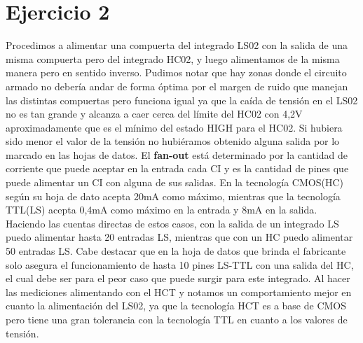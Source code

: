 \part*{Ejercicio 2}
Procedimos a alimentar una compuerta del integrado LS02 con la salida de una misma compuerta pero del integrado HC02, y luego alimentamos de la misma manera pero en sentido inverso. Pudimos notar que hay zonas donde el circuito armado no deber\'ia andar de forma \'optima por el margen de ruido que manejan las distintas compuertas pero funciona igual ya que la ca\'ida de tensi\'on en el LS02 no es tan grande y alcanza a caer cerca del l\'imite del HC02 con 4,2V aproximadamente que es el m\'inimo del estado HIGH para el HC02. Si hubiera sido menor el valor de la tensi\'on no hubi\'eramos obtenido alguna salida por lo marcado en las hojas de datos.
\newline
El \textbf{fan-out} est\'a determinado por la cantidad de corriente que puede aceptar en la entrada cada CI y es la cantidad de pines que puede alimentar un CI con alguna de sus salidas. En la tecnolog\'ia CMOS(HC) seg\'un su hoja de dato acepta 20mA como m\'aximo, mientras que la tecnolog\'ia TTL(LS) acepta 0,4mA como m\'aximo en la entrada y 8mA en la salida. Haciendo las cuentas directas de estos casos, con la salida de un integrado LS puedo alimentar hasta 20 entradas LS, mientras que con un HC puedo alimentar 50 entradas LS. Cabe destacar que en la hoja de datos que brinda el fabricante solo asegura el funcionamiento de hasta 10 pines LS-TTL con una salida del HC, el cual debe ser para el peor caso que puede surgir para este integrado.
\newline
Al hacer las mediciones alimentando con el HCT y notamos un comportamiento mejor en cuanto la alimentaci\'on del LS02, ya que la tecnolog\'ia HCT es a base de CMOS pero tiene una gran tolerancia con la tecnolog\'ia TTL en cuanto a los valores de tensi\'on.
